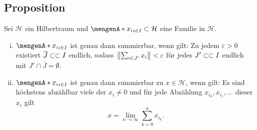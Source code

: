 \subsection[Proposition: Charakterisierungen von Summierbarkeit]{Proposition} %
\label{sub:717}
Sei $\mathcal{H}$ ein Hilbertraum und $\set{x_i}_{i \in I} \subset \mathcal{H}$ eine Familie in $\mathcal{H}$. 
\begin{enumerate}[(i)]
	\item $\set{x_i}_{i \in I}$ ist genau dann summierbar, wenn gilt: Zu jedem $\varepsilon>0$ existiert $\overline{J} \subset\mkern-0.7mu \subset I$ endlich, sodass 
	$\norm{\sum_{i \in J'}x_i}< \varepsilon$ für jedes $J' \subset\mkern-0.7mu \subset I$ endlich mit $J' \cap \overline{J} = \emptyset$.
	\item $\set{x_i}_{i \in I}$ ist genau dann summierbar zu $x \in \mathcal{H}$, wenn gilt: Es sind höchstens abzählbar viele der $x_i \not=0$ und für jede Abzählung 
	$x_{i_0}, x_{i_1}, \ldots $ dieser $x_i$ gilt 
	\[
		x= \lim_{n \to \infty} \sum_{k=0}^{n} x_{i_k}.
	\]
\end{enumerate}
